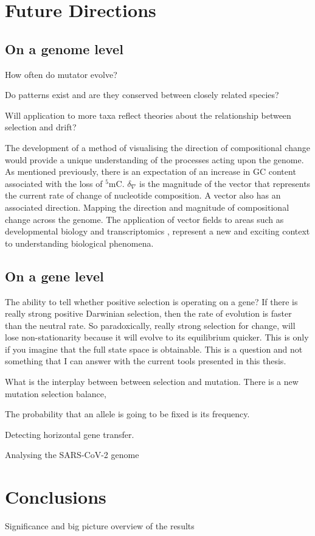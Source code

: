 \section{Future Directions}

\subsection{On a genome level}
How often do mutator evolve? 

Do patterns exist and are they conserved between closely related species?

Will application to more taxa reflect theories about the relationship between selection and drift?

The development of a method of visualising the direction of compositional change would provide a unique understanding of the processes acting upon the genome. As mentioned previously, there is an expectation of an increase in GC content associated with the loss of $^5$mC. $\delta_\nabla$ is the magnitude of the vector that represents the current rate of change of nucleotide composition. A vector also has an associated direction. Mapping the direction and magnitude of compositional change across the genome. The application of vector fields to areas such as developmental biology \citep{Steiner2009VectorEmbryogeny} and transcriptomics \citep{Qiu2021MappingCells}, represent a new and exciting context to understanding biological phenomena. 

\subsection{On a gene level}

The ability to tell whether positive selection is operating on a gene?
If there is really strong positive Darwinian selection, then the rate of evolution is faster than the neutral rate. So paradoxically, really strong selection for change, will lose non-stationarity because it will evolve to its equilibrium quicker. This is only if you imagine that the full state space is obtainable. This is a question and not something that I can answer with the current tools presented in this thesis. 

What is the interplay between between selection and mutation. There is a new mutation selection balance, 

The probability that an allele is going to be fixed is its frequency. 


Detecting horizontal gene transfer. 

Analysing the SARS-CoV-2 genome

\section{Conclusions}

Significance and big picture overview of the results